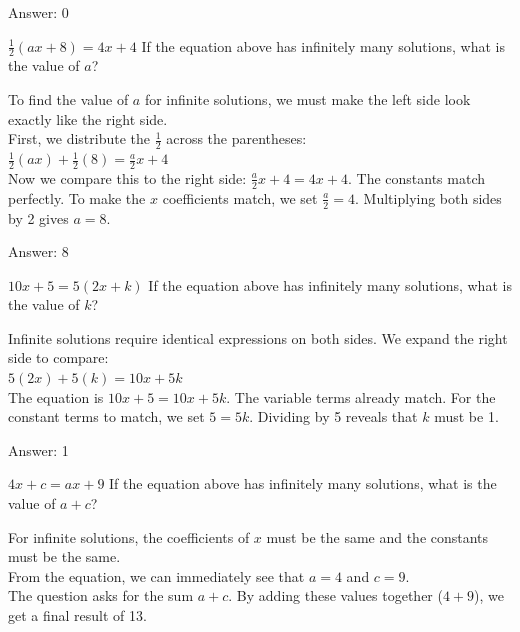 \documentclass[11pt,paper=a4,answers]{exam}
\begin{document}
\begin{questions}
\begin{solution}
\vspace{20pt}
Answer: \colorbox{yellow!100}{0}
\end{solution}

\question
$\frac{1}{2}(ax + 8) = 4x + 4$
If the equation above has infinitely many solutions, what is the value of $a$?

\begin{solution}
To find the value of $a$ for infinite solutions, we must make the left side look exactly like the right side. 
\\[10pt]
First, we distribute the $\frac{1}{2}$ across the parentheses:
\\[10pt]
$\frac{1}{2}(ax) + \frac{1}{2}(8) = \frac{a}{2}x + 4$
\\[10pt]
Now we compare this to the right side: $\frac{a}{2}x + 4 = 4x + 4$. The constants match perfectly. To make the $x$ coefficients match, we set $\frac{a}{2} = 4$. Multiplying both sides by 2 gives $a = 8$.

\vspace{20pt}
Answer: \colorbox{yellow!100}{8}
\end{solution}

\question
$10x + 5 = 5(2x + k)$
If the equation above has infinitely many solutions, what is the value of $k$?

\begin{solution}
Infinite solutions require identical expressions on both sides. We expand the right side to compare:
\\[10pt]
$5(2x) + 5(k) = 10x + 5k$
\\[10pt]
The equation is $10x + 5 = 10x + 5k$. The variable terms already match. For the constant terms to match, we set $5 = 5k$. Dividing by 5 reveals that $k$ must be 1.

\vspace{20pt}
Answer: \colorbox{yellow!100}{1}
\end{solution}

\question
$4x + c = ax + 9$
If the equation above has infinitely many solutions, what is the value of $a + c$?

\begin{solution}
For infinite solutions, the coefficients of $x$ must be the same and the constants must be the same. 
\\[10pt]
From the equation, we can immediately see that $a = 4$ and $c = 9$. 
\\[10pt]
The question asks for the sum $a + c$. By adding these values together ($4 + 9$), we get a final result of 13.


\end{solution}
\end{questions}
\end{document}

